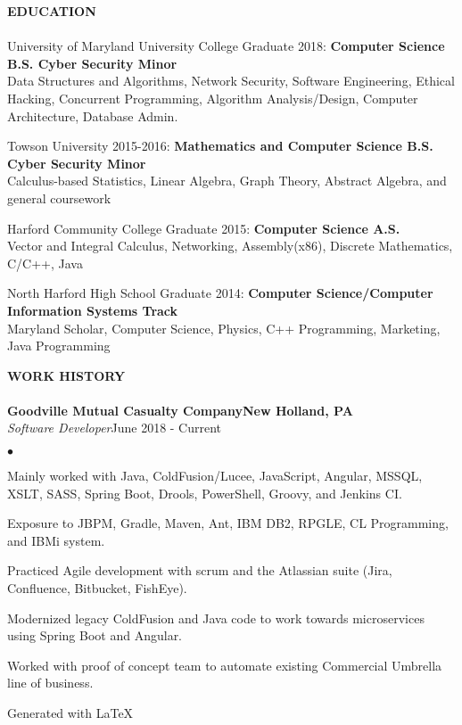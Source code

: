 \documentclass{article}
\newcommand{\lineunder}{
	\vspace*{-4pt}\\ 
	\hspace*{-18pt}\hrulefill \\
}
\newcommand{\header}[1]{
	{\hspace*{-15pt}\vspace*{6pt}\textsc{#1}}\vspace*{-6pt}\lineunder
}
\newcommand{\employer}[5]{
	{\textbf{#1}{\hfill\textbf{#2}}\\ 
	{{\emph{#3}}}\hfill {#4}\\ \hfill {#5}}
}
\newcommand{\education}[3]{
	{#1} \textbf{#2}\\
	{\hspace*{12pt}#3 }\\ 
	\vspace*{5pt}
}
\newenvironment{resumecontent}{
	\begin{list}
		{\small$\bullet$}{\topsep 0pt \itemsep -2pt}}{\vspace*{4pt}
	\end{list}
}
\newcommand{\resumeheader}[1]{
	\vspace*{5pt}
	\header{\textbf{#1}}
}
\begin{document}
	\resumeheader{EDUCATION}
		\education
			{University of Maryland University College Graduate 2018:} 
			{Computer Science B.S. Cyber Security Minor}
			{Data Structures and Algorithms, Network Security, Software Engineering, Ethical Hacking, Concurrent
			\hspace*{12pt}Programming, Algorithm Analysis/Design, Computer Architecture, Database Admin.}
		\education
			{Towson University 2015-2016:} 
			{Mathematics and Computer Science B.S. Cyber Security Minor}
			{Calculus-based Statistics, Linear Algebra, Graph Theory, Abstract Algebra, and general coursework}
		\education
			{Harford Community College Graduate 2015:}
			{Computer Science A.S.}
			{Vector and Integral Calculus, Networking, Assembly(x86), Discrete Mathematics, C/C++, Java}
		\education
			{North Harford High School Graduate 2014:} 
			{Computer Science/Computer Information Systems Track}
			{Maryland Scholar, Computer Science, Physics, C++ Programming, Marketing, Java Programming}

	\resumeheader{WORK HISTORY}
		\employer{Goodville Mutual Casualty Company}{New Holland, PA}{Software Developer} {June 2018 - Current} {}
			\vspace*{-8pt}
			\begin{resumecontent}
				\item Mainly worked with Java, ColdFusion/Lucee, JavaScript, Angular, MSSQL, XSLT, SASS, Spring Boot, Drools, PowerShell, Groovy, and Jenkins CI.
				\item Exposure to JBPM, Gradle, Maven, Ant, IBM DB2, RPGLE, CL Programming, and IBMi system.
				\item Practiced Agile development with scrum and the Atlassian suite (Jira, Confluence, Bitbucket, FishEye).
				\item Modernized legacy ColdFusion and Java code to work towards microservices using Spring Boot and Angular.
				\item Worked with proof of concept team to automate existing Commercial Umbrella line of business.
			\end{resumecontent}

	\begin{center}
		\small 
		\vspace*{30pt} Generated with \LaTeX
	\end{center}
\end{document}
